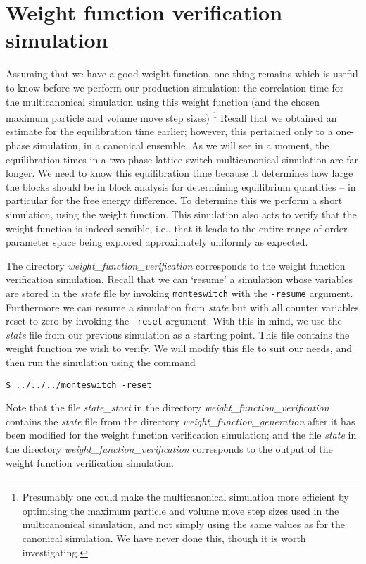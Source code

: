 \documentclass{report}
\begin{document}
\section{Weight function verification simulation}
Assuming that we have a good weight function, one thing remains which is useful to know before we perform our production simulation: the correlation time 
for the multicanonical simulation using this weight function (and the chosen maximum particle and volume move step sizes)
\footnote{Presumably one could make the multicanonical simulation more efficient by optimising the maximum particle and volume move step sizes used in the 
multicanonical simulation, and not simply using the same values as for the canonical simulation. We have never done this, though it is worth investigating.}
Recall that we obtained an estimate for the equilibration time earlier; however, this pertained only to a one-phase simulation,
in a canonical ensemble. As we will see in a moment, the equilibration times in a two-phase lattice switch multicanonical simulation are far longer. 
We need to know this equilibration time because it determines how large the blocks should be in block analysis for determining equilibrium quantities -- 
in particular for the free energy difference. To determine this we perform a short simulation, using the weight function. This simulation also acts to
verify that the weight function is indeed sensible, i.e., that it leads to the entire range of order-parameter space being explored approximately 
uniformly as expected.

The directory \emph{weight\_function\_verification} corresponds to the weight function verification simulation.
Recall that we can `resume' a simulation whose variables are stored in the \emph{state} file by invoking \texttt{monteswitch} with the 
\texttt{-resume} argument. Furthermore
we can resume a simulation from \emph{state} but with all counter variables reset to zero by invoking the \texttt{-reset} argument. With this in mind, we
use the \emph{state} file from our previous simulation as a starting point. This file contains the weight function we wish to verify. We will modify this
file to suit our needs, and then run the simulation using the command
\begin{verbatim}
$ ../../../monteswitch -reset
\end{verbatim}
Note that the file \emph{state\_start} in the directory \emph{weight\_function\_verification} contains the \emph{state} file from the directory 
\emph{weight\_function\_generation}
after it has been modified for the weight function verification simulation; and the file \emph{state} in the directory \emph{weight\_function\_verification}
corresponds to the output of the weight function verification simulation.
\end{document}
